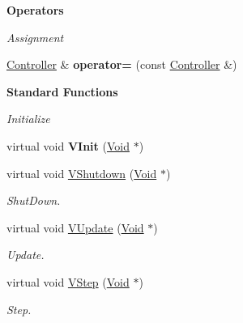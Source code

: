 \begin{Indent}{\bf Operators}\par
{\em \label{_amgrpb3c5827f54218753bb2c3338236446c2}
 Assignment }\begin{DoxyCompactItemize}
\item 
\hypertarget{classContent_1_1Actor_1_1Physics_1_1Controller_ad41b15490a378743ee4ecb0988ff27fb}{
\hyperlink{classContent_1_1Actor_1_1Physics_1_1Controller}{Controller} \& {\bfseries operator=} (const \hyperlink{classContent_1_1Actor_1_1Physics_1_1Controller}{Controller} \&)}
\label{classContent_1_1Actor_1_1Physics_1_1Controller_ad41b15490a378743ee4ecb0988ff27fb}

\end{DoxyCompactItemize}
\end{Indent}
\begin{Indent}{\bf Standard Functions}\par
{\em \label{_amgrp73a6f6f6732ceea086632f66fc34a9e7}
 Initialize }\begin{DoxyCompactItemize}
\item 
\hypertarget{classContent_1_1Actor_1_1Physics_1_1Controller_acca8f67a3ee27936336030fbd4fadd6c}{
virtual void {\bfseries VInit} (\hyperlink{structVoid}{Void} $\ast$)}
\label{classContent_1_1Actor_1_1Physics_1_1Controller_acca8f67a3ee27936336030fbd4fadd6c}

\item 
\hypertarget{classContent_1_1Actor_1_1Physics_1_1Controller_a586ddf266315fd37b189f14a1a1cc19d}{
virtual void \hyperlink{classContent_1_1Actor_1_1Physics_1_1Controller_a586ddf266315fd37b189f14a1a1cc19d}{VShutdown} (\hyperlink{structVoid}{Void} $\ast$)}
\label{classContent_1_1Actor_1_1Physics_1_1Controller_a586ddf266315fd37b189f14a1a1cc19d}

\begin{DoxyCompactList}\small\item\em ShutDown. \item\end{DoxyCompactList}\item 
\hypertarget{classContent_1_1Actor_1_1Physics_1_1Controller_adf55900277701d1da4540b389e08f65c}{
virtual void \hyperlink{classContent_1_1Actor_1_1Physics_1_1Controller_adf55900277701d1da4540b389e08f65c}{VUpdate} (\hyperlink{structVoid}{Void} $\ast$)}
\label{classContent_1_1Actor_1_1Physics_1_1Controller_adf55900277701d1da4540b389e08f65c}

\begin{DoxyCompactList}\small\item\em Update. \item\end{DoxyCompactList}\item 
virtual void \hyperlink{classContent_1_1Actor_1_1Physics_1_1Controller_a316b3776da05a4c7eb80242309a7b81d}{VStep} (\hyperlink{structVoid}{Void} $\ast$)
\begin{DoxyCompactList}\small\item\em Step. \item\end{DoxyCompactList}\end{DoxyCompactItemize}
\end{Indent}
